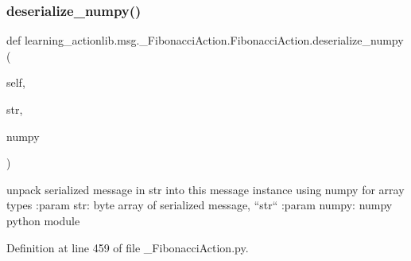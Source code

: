 \subsubsection{\texorpdfstring{deserialize\+\_\+numpy()}{deserialize\_numpy()}}
{\footnotesize\ttfamily def learning\+\_\+actionlib.\+msg.\+\_\+\+Fibonacci\+Action.\+Fibonacci\+Action.\+deserialize\+\_\+numpy (\begin{DoxyParamCaption}\item[{}]{self,  }\item[{}]{str,  }\item[{}]{numpy }\end{DoxyParamCaption})}

\begin{DoxyVerb}unpack serialized message in str into this message instance using numpy for array types
:param str: byte array of serialized message, ``str``
:param numpy: numpy python module
\end{DoxyVerb}
 

Definition at line 459 of file \+\_\+\+Fibonacci\+Action.\+py.


